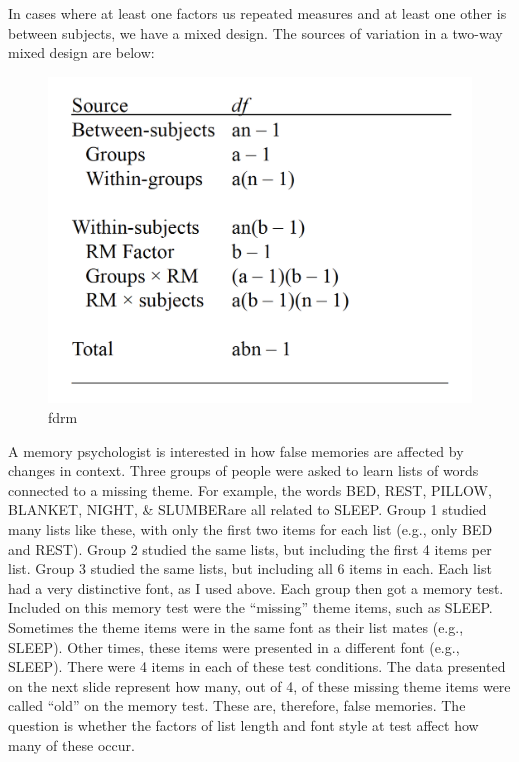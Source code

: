 \documentclass[]{book}
\theoremstyle{definition}
\theoremstyle{definition}
\theoremstyle{definition}
\theoremstyle{remark}
\begin{document}
In cases where at least one factors us repeated measures and at least
one other is between subjects, we have a mixed design. The sources of
variation in a two-way mixed design are below:

\begin{figure}
\centering
\includegraphics{img/hicksfdrm4.png}
\caption{fdrm}
\end{figure}

A memory psychologist is interested in how false memories are affected
by changes in context. Three groups of people were asked to learn lists
of words connected to a missing theme. For example, the words BED, REST,
PILLOW, BLANKET, NIGHT, \& SLUMBERare all related to SLEEP. Group 1
studied many lists like these, with only the first two items for each
list (e.g., only BED and REST). Group 2 studied the same lists, but
including the first 4 items per list. Group 3 studied the same lists,
but including all 6 items in each. Each list had a very distinctive
font, as I used above. Each group then got a memory test. Included on
this memory test were the ``missing'' theme items, such as SLEEP.
Sometimes the theme items were in the same font as their list mates
(e.g., SLEEP). Other times, these items were presented in a different
font (e.g., SLEEP). There were 4 items in each of these test conditions.
The data presented on the next slide represent how many, out of 4, of
these missing theme items were called ``old'' on the memory test. These
are, therefore, false memories. The question is whether the factors of
list length and font style at test affect how many of these occur.
\end{document}
